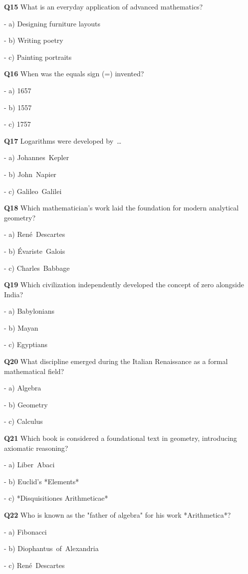 \textbf{Q15} What is an everyday application of advanced mathematics?\par
\quad - a) Designing furniture layouts\par
\quad - b) Writing poetry\par
\quad - c) Painting portraits\par

\textbf{Q16} When was the equals sign (=) invented?\par
\quad - a) 1657\par
\quad - b) 1557\par
\quad - c) 1757\par

\textbf{Q17} Logarithms were developed by …\par
\quad - a) Johannes Kepler\par
\quad - b) John Napier\par
\quad - c) Galileo Galilei\par

\textbf{Q18} Which mathematician's work laid the foundation for modern analytical geometry?\par
\quad - a) René Descartes\par
\quad - b) Évariste Galois\par
\quad - c) Charles Babbage\par

\textbf{Q19} Which civilization independently developed the concept of zero alongside India?\par
\quad - a) Babylonians\par
\quad - b) Mayan\par
\quad - c) Egyptians\par

\textbf{Q20} What discipline emerged during the Italian Renaissance as a formal mathematical field?\par
\quad - a) Algebra\par
\quad - b) Geometry\par
\quad - c) Calculus\par

\textbf{Q21} Which book is considered a foundational text in geometry, introducing axiomatic reasoning?\par
\quad - a) Liber Abaci\par
\quad - b) Euclid's *Elements*\par
\quad - c) *Disquisitiones Arithmeticae*\par

\textbf{Q22} Who is known as the "father of algebra" for his work *Arithmetica*?\par
\quad - a) Fibonacci\par
\quad - b) Diophantus of Alexandria\par
\quad - c) René Descartes\par

